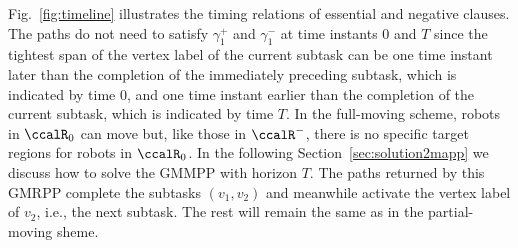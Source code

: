 \documentclass[Afour,sageh,times]{sagej}
\newcommand{\vertex}[1]{v_{\textup{#1}}}
\begin{document}
{{ Fig.~\ref{fig:timeline} illustrates the timing relations of essential and negative clauses.  The paths do not need to satisfy  $\gamma_1^+$ and $\gamma_1^-$ at time instants 0 and  $T$ since the tightest span of the vertex label of the current subtask can be one time instant later than the completion of the immediately preceding subtask, which is indicated by time 0, and one time instant earlier than the completion of the current subtask, which is indicated by time $T$. In the full-moving scheme, robots in $\ccalR_0$ can move but, like those in $\ccalR^-$, there is no specific target regions for robots in $\ccalR_0$.  In the following Section~\ref{sec:solution2mapp} we discuss how to solve the GMMPP with horizon $T$.  The paths returned by this GMRPP complete the subtasks $(v_1, v_2)$  and meanwhile activate the vertex label of $v_2$, i.e., the next subtask. %
 The rest will remain the same as in the partial-moving sheme.




}}
\end{document}
